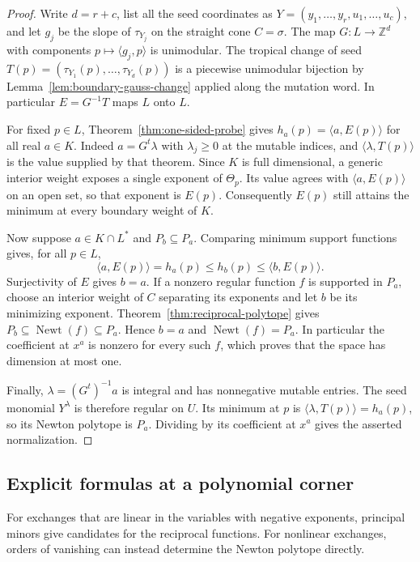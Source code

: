 \documentclass[11pt,reqno]{amsart}
\numberwithin{equation}{section}
\theoremstyle{definition}
\theoremstyle{remark}
\DeclareMathOperator{\Newt}{Newt}
\begin{document}
\begin{proof}
Write \(d=r+c\), list all the seed coordinates as
\(Y=(y_1,\ldots,y_r,u_1,\ldots,u_c)\), and let \(g_j\) be the slope
of \(\tau_{Y_j}\) on the straight cone \(C=\sigma\). The map
\(G:L\longrightarrow\mathbb Z^d\) with components
\(p\mapsto\langle g_j,p\rangle\) is unimodular. The tropical change of seed
\(T(p)=(\tau_{Y_1}(p),\ldots,\tau_{Y_d}(p))\) is a piecewise
unimodular bijection by
Lemma~\ref{lem:boundary-gauss-change} applied along the mutation word.
In particular \(E=G^{-1}T\) maps \(L\) onto \(L\).

For fixed \(p\in L\), Theorem~\ref{thm:one-sided-probe} gives
\(h_a(p)=\langle a,E(p)\rangle\) for all real \(a\in K\).
Indeed \(a=G^t\lambda\) with \(\lambda_j\geq0\) at the mutable
indices, and \(\langle\lambda,T(p)\rangle\) is the value supplied
by that theorem. Since \(K\) is full dimensional, a generic interior
weight exposes a single exponent of \(\Theta_p\). Its value agrees
with \(\langle a,E(p)\rangle\) on an open set, so that exponent is
\(E(p)\). Consequently \(E(p)\) still attains the minimum at every
boundary weight of \(K\).

Now suppose \(a\in K\cap L^*\) and \(P_b\subseteq P_a\). Comparing
minimum support functions gives, for all \(p\in L\),
\[ \langle a,E(p)\rangle=h_a(p)\leq h_b(p) \leq\langle b,E(p)\rangle . \]
Surjectivity of \(E\) gives \(b=a\). If a nonzero regular function
\(f\) is supported in \(P_a\), choose an interior weight of \(C\)
separating its exponents and let \(b\) be its minimizing exponent.
Theorem~\ref{thm:reciprocal-polytope} gives
\(P_b\subseteq\Newt(f)\subseteq P_a\). Hence \(b=a\) and
\(\Newt(f)=P_a\). In particular the coefficient at \(x^a\) is
nonzero for every such \(f\), which proves that the space has dimension
at most one.

Finally, \(\lambda=(G^t)^{-1}a\) is integral and has nonnegative
mutable entries. The seed monomial \(Y^\lambda\) is therefore
regular on \(U\). Its minimum at \(p\) is
\(\langle\lambda,T(p)\rangle=h_a(p)\), so its Newton polytope is
\(P_a\). Dividing by its coefficient at \(x^a\) gives the asserted
normalization.
\end{proof}

\subsection{Explicit formulas at a polynomial corner}

For exchanges that are linear in the variables with negative exponents,
principal minors give candidates for the reciprocal functions. For
nonlinear exchanges, orders of vanishing can instead determine the
Newton polytope directly.
\end{document}
